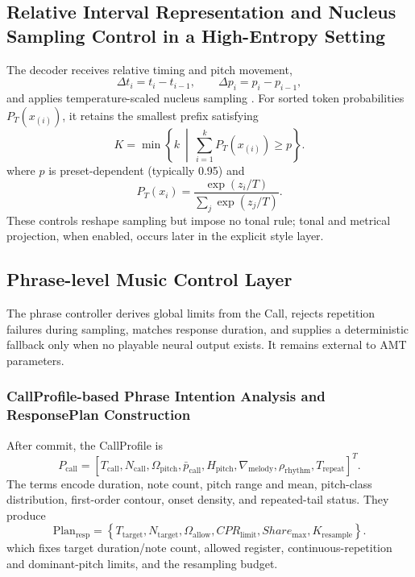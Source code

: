 \documentclass[11pt,a4paper]{article}
\begin{document}
\subsection{Relative Interval Representation and Nucleus Sampling Control in a High-Entropy Setting}
\label{sec:relative-interval-nucleus-sampling}

The decoder receives relative timing and pitch movement,
\begin{equation}
\Delta t_i=t_i-t_{i-1},\qquad \Delta p_i=p_i-p_{i-1},
\label{eq:relative-arrival-time}
\end{equation}
and applies temperature-scaled nucleus sampling \citep{holtzman2020curious}. For sorted token probabilities $P_T(x_{(i)})$, it retains the smallest prefix satisfying
\begin{equation}
K =
\min \left\{
k
\ \middle|\
\sum_{i=1}^{k} P_T(x_{(i)}) \geq p
\right\}.
\label{eq:nucleus-k}
\end{equation}
where $p$ is preset-dependent (typically 0.95) and
\begin{equation}
P_T(x_i)
=
\frac{\exp(z_i/T)}
{\sum_j \exp(z_j/T)}.
\label{eq:temperature-scaling}
\end{equation}
These controls reshape sampling but impose no tonal rule; tonal and metrical projection, when enabled, occurs later in the explicit style layer.
\subsection{Phrase-level Music Control Layer}
\label{sec:phrase-level-control}

The phrase controller derives global limits from the Call, rejects repetition failures during sampling, matches response duration, and supplies a deterministic fallback only when no playable neural output exists. It remains external to AMT parameters.

\subsubsection{CallProfile-based Phrase Intention Analysis and ResponsePlan Construction}
\label{sec:callprofile-responseplan}

After commit, the CallProfile is
\begin{equation}
P_{\mathrm{call}}
=
\left[
T_{\mathrm{call}},
N_{\mathrm{call}},
\Omega_{\mathrm{pitch}},
\bar{p}_{\mathrm{call}},
H_{\mathrm{pitch}},
\nabla_{\mathrm{melody}},
\rho_{\mathrm{rhythm}},
T_{\mathrm{repeat}}
\right]^T.
\label{eq:callprofile-vector}
\end{equation}
The terms encode duration, note count, pitch range and mean, pitch-class distribution, first-order contour, onset density, and repeated-tail status. They produce
\begin{equation}
\mathrm{Plan}_{\mathrm{resp}}
=
\left\{
T_{\mathrm{target}},
N_{\mathrm{target}},
\Omega_{\mathrm{allow}},
CPR_{\mathrm{limit}},
Share_{\max},
K_{\mathrm{resample}}
\right\}.
\label{eq:responseplan}
\end{equation}
which fixes target duration/note count, allowed register, continuous-repetition and dominant-pitch limits, and the resampling budget.
\end{document}
